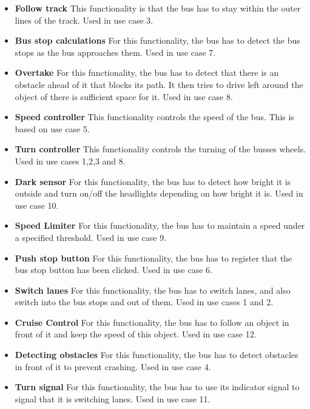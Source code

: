 \begin{itemize}
\item \textbf{Follow track}
This functionality is that the bus has to stay within the outer lines of the track. Used in use case 3.
\item \textbf{Bus stop calculations}
For this functionality, the bus has to detect the bus stops as the bus approaches them. Used in use case 7.
\item \textbf{Overtake}
For this functionality, the bus has to detect that there is an obstacle ahead of it that blocks its path. It then tries to drive left around the object of there is sufficient space for it. Used in use case 8.
\item \textbf{Speed controller}
This functionality controls the speed of the bus. This is based on use case 5.
\item \textbf{Turn controller}
This functionality controls the turning of the busses wheels. Used in use cases 1,2,3 and 8.
\item \textbf{Dark sensor}
For this functionality, the bus has to detect how bright it is outside and turn on/off the headlights depending on how bright it is. Used in use case 10.
\item \textbf{Speed Limiter}
For this functionality, the bus has to maintain a speed under a specified threshold. Used in use case 9.
\item \textbf{Push stop button}
For this functionality, the bus has to register that the bus stop button has been clicked. Used in use case 6.
\item \textbf{Switch lanes}
For this functionality, the bus has to switch lanes, and also switch into the bus stops and out of them. Used in use cases 1 and 2.
\item \textbf{Cruise Control}
For this functionality, the bus has to follow an object in front of it and keep the speed of this object. Used in use case 12.
\item \textbf{Detecting obstacles}
For this functionality, the bus has to detect obstacles in front of it to prevent crashing. Used in use case 4.
\item \textbf{Turn signal}
For this functionality, the bus has to use its indicator signal to signal that it is switching lanes. Used in use case  11.
\end{itemize}

